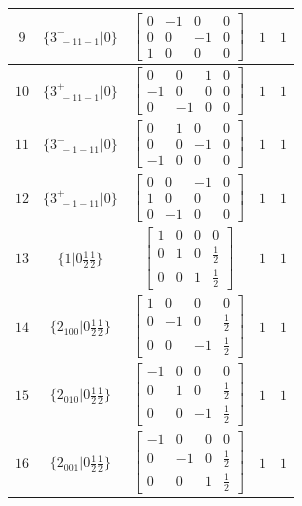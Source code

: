 \documentclass[fleqn,8pt]{jsarticle}
\begin{document}
\begin{longtable}{ccccc}
$ 9 $ & $ \{3^{-}_{\,\,-11-1}|0\} $ & $ \begin{bmatrix} 0 & -1 & 0 & 0 \\ 0 & 0 & -1 & 0 \\ 1 & 0 & 0 & 0 \end{bmatrix} $ & $ 1 $ & $ 1 $ \\ \hline
$ 10 $ & $ \{3^{+}_{\,\,-11-1}|0\} $ & $ \begin{bmatrix} 0 & 0 & 1 & 0 \\ -1 & 0 & 0 & 0 \\ 0 & -1 & 0 & 0 \end{bmatrix} $ & $ 1 $ & $ 1 $ \\ \hline
$ 11 $ & $ \{3^{-}_{\,\,-1-11}|0\} $ & $ \begin{bmatrix} 0 & 1 & 0 & 0 \\ 0 & 0 & -1 & 0 \\ -1 & 0 & 0 & 0 \end{bmatrix} $ & $ 1 $ & $ 1 $ \\ \hline
$ 12 $ & $ \{3^{+}_{\,\,-1-11}|0\} $ & $ \begin{bmatrix} 0 & 0 & -1 & 0 \\ 1 & 0 & 0 & 0 \\ 0 & -1 & 0 & 0 \end{bmatrix} $ & $ 1 $ & $ 1 $ \\ \hline
$ 13 $ & $ \{1|0 \frac{1}{2} \frac{1}{2}\} $ & $ \begin{bmatrix} 1 & 0 & 0 & 0 \\ 0 & 1 & 0 & \frac{1}{2} \\ 0 & 0 & 1 & \frac{1}{2} \end{bmatrix} $ & $ 1 $ & $ 1 $ \\ \hline
$ 14 $ & $ \{2{}_{100}|0 \frac{1}{2} \frac{1}{2}\} $ & $ \begin{bmatrix} 1 & 0 & 0 & 0 \\ 0 & -1 & 0 & \frac{1}{2} \\ 0 & 0 & -1 & \frac{1}{2} \end{bmatrix} $ & $ 1 $ & $ 1 $ \\ \hline
$ 15 $ & $ \{2{}_{010}|0 \frac{1}{2} \frac{1}{2}\} $ & $ \begin{bmatrix} -1 & 0 & 0 & 0 \\ 0 & 1 & 0 & \frac{1}{2} \\ 0 & 0 & -1 & \frac{1}{2} \end{bmatrix} $ & $ 1 $ & $ 1 $ \\ \hline
$ 16 $ & $ \{2{}_{001}|0 \frac{1}{2} \frac{1}{2}\} $ & $ \begin{bmatrix} -1 & 0 & 0 & 0 \\ 0 & -1 & 0 & \frac{1}{2} \\ 0 & 0 & 1 & \frac{1}{2} \end{bmatrix} $ & $ 1 $ & $ 1 $ \\ \hline

\end{longtable}
\end{document}
